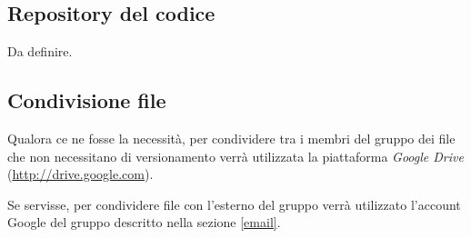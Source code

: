 \subsection{Repository del codice}

Da definire.

\subsection{Condivisione file}

Qualora ce ne fosse la necessità, per condividere tra i membri del gruppo dei file che non necessitano di versionamento verrà utilizzata la piattaforma \emph{Google Drive} (\url{http://drive.google.com}).

Se servisse, per condividere file con l'esterno del gruppo verrà utilizzato l'account Google del gruppo descritto nella sezione \ref{email}.
